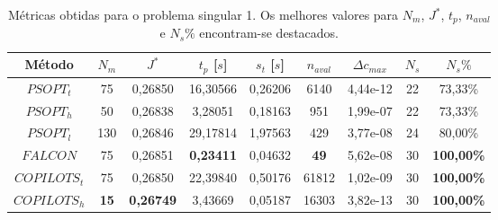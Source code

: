 \begin{table}
	\centering
	\caption[Métricas obtidas para o problema singular 1]{Métricas obtidas para o problema singular 1. Os melhores valores para $ N_m $, $ J^* $, $ t_p $, $ n_{aval} $ e $ N_s\% $ encontram-se destacados.}
	\label{tab:singular1:raw}
	\begin{tabular}{@{}ccccccccc@{}}
		\toprule
		Método       & $N_m$                              & $J^*$                                   & $t_p$ {[}$s${]}                         & $s_t$ {[}$s${]} & $n_{aval}$                         & $\Delta c_{max}$                         & $N_s$ & $N_s\%$                                  \\ \midrule
		$PSOPT_t$    & 75                                 & 0,26850                                 & 16,30566                                & 0,26206         & 6140                               & 4,44e-12                                 & 22    & 73,33\%                                  \\
		$PSOPT_h$    & 50                                 & 0,26838                                 & 3,28051                                 & 0,18163         & 951                                & 1,99e-07                                 & 22    & 73,33\%                                  \\
		$PSOPT_l$    & 130                                & 0,26846                                 & 29,17814                                & 1,97563         & 429                                & 3,77e-08                                 & 24    & 80,00\%                                  \\
		$FALCON$     & 75                                 & 0,26851                                 & {\color[HTML]{009901} \textbf{0,23411}} & 0,04632         & {\color[HTML]{009901} \textbf{49}} & 5,62e-08                                 & 30    & {\color[HTML]{009901} \textbf{100,00\%}} \\
		$COPILOTS_t$ & 75                                 & 0,26850                                 & 22,39840                                & 0,50176         & 61812                              & 1,02e-09                                 & 30    & {\color[HTML]{009901} \textbf{100,00\%}} \\
		$COPILOTS_h$ & {\color[HTML]{009901} \textbf{15}} & {\color[HTML]{009901} \textbf{0,26749}} & 3,43669                                 & 0,05187         & 16303                              & 3,82e-13 & 30    & {\color[HTML]{009901} \textbf{100,00\%}} \\ \bottomrule
	\end{tabular}
\end{table}